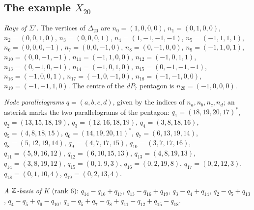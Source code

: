 \subsection{The example \texorpdfstring{$X_{20}$}{X20}}\label{app:data-x20}
\emph{Rays of $\Sigma'$.} The vertices of $\Delta_{20}$ are $n_{0}=(1,0,0,0)$, $n_{1}=(0,1,0,0)$, $n_{2}=(0,0,1,0)$, $n_{3}=(0,0,0,1)$, $n_{4}=(1,-1,-1,-1)$, $n_{5}=(-1,1,1,1)$, $n_{6}=(0,0,0,-1)$, $n_{7}=(0,0,-1,0)$, $n_{8}=(0,-1,0,0)$, $n_{9}=(-1,1,0,1)$, $n_{10}=(0,0,-1,-1)$, $n_{11}=(-1,1,0,0)$, $n_{12}=(-1,0,1,1)$, $n_{13}=(0,-1,0,-1)$, $n_{14}=(-1,0,1,0)$, $n_{15}=(0,-1,-1,-1)$, $n_{16}=(-1,0,0,1)$, $n_{17}=(-1,0,-1,0)$, $n_{18}=(-1,-1,0,0)$, $n_{19}=(-1,-1,1,0)$.
 The centre of the $dP_7$ pentagon is $n_{20}=(-1,0,0,0)$.

\emph{Node parallelograms} $q=(a,b,c,d)$, given by the indices of $n_a,n_b,n_c,n_d$; an asterisk marks the two parallelograms of the pentagon: $q_{1}=(18,19,20,17)^{*}$, $q_{2}=(13,15,18,19)$, $q_{3}=(12,16,18,19)$, $q_{4}=(3,8,18,16)$, $q_{5}=(4,8,18,15)$, $q_{6}=(14,19,20,11)^{*}$, $q_{7}=(6,13,19,14)$, $q_{8}=(5,12,19,14)$, $q_{9}=(4,7,17,15)$, $q_{10}=(3,7,17,16)$, $q_{11}=(5,9,16,12)$, $q_{12}=(6,10,15,13)$, $q_{13}=(4,8,19,13)$, $q_{14}=(3,8,19,12)$, $q_{15}=(0,1,9,3)$, $q_{16}=(0,2,19,8)$, $q_{17}=(0,2,12,3)$, $q_{18}=(0,1,10,4)$, $q_{19}=(0,2,13,4)$.

\emph{A $\mathbb Z$-basis of $K$} (rank 6): $q_{14}-q_{16}+q_{17}$, $q_{13}-q_{16}+q_{19}$, $q_{3}-q_{4}+q_{14}$, $q_{2}-q_{5}+q_{13}$, $q_{4}-q_{5}+q_{9}-q_{10}$, $q_{4}-q_{5}+q_{7}-q_{8}+q_{11}-q_{12}+q_{15}-q_{18}$.

